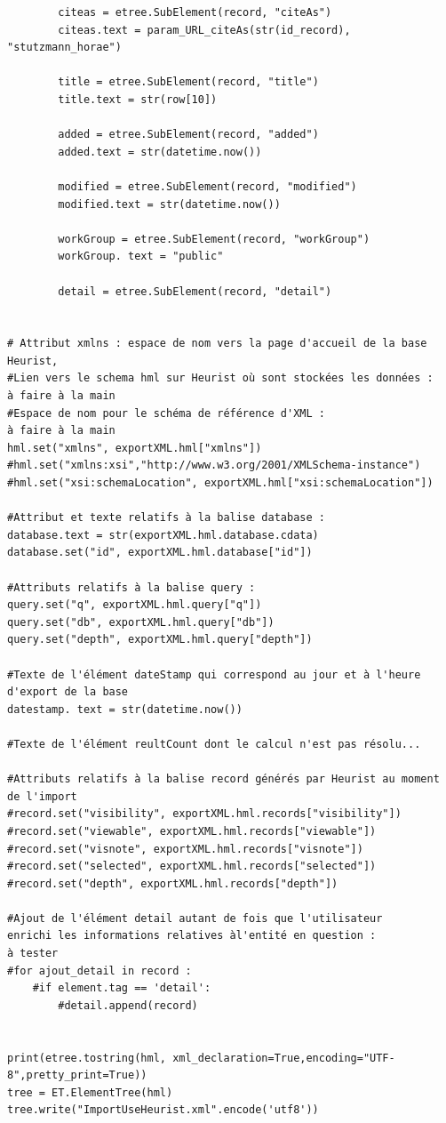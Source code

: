 \documentclass[a4paper,12pt,twoside]{book}
\begin{document}
\begin{verbatim}
        citeas = etree.SubElement(record, "citeAs")       
        citeas.text = param_URL_citeAs(str(id_record), "stutzmann_horae")
        
        title = etree.SubElement(record, "title")
        title.text = str(row[10])

        added = etree.SubElement(record, "added")
        added.text = str(datetime.now())

        modified = etree.SubElement(record, "modified")
        modified.text = str(datetime.now())

        workGroup = etree.SubElement(record, "workGroup")
        workGroup. text = "public"

        detail = etree.SubElement(record, "detail")


# Attribut xmlns : espace de nom vers la page d'accueil de la base Heurist,
#Lien vers le schema hml sur Heurist où sont stockées les données : 
à faire à la main
#Espace de nom pour le schéma de référence d'XML :
à faire à la main
hml.set("xmlns", exportXML.hml["xmlns"])
#hml.set("xmlns:xsi","http://www.w3.org/2001/XMLSchema-instance")
#hml.set("xsi:schemaLocation", exportXML.hml["xsi:schemaLocation"])

#Attribut et texte relatifs à la balise database :
database.text = str(exportXML.hml.database.cdata)
database.set("id", exportXML.hml.database["id"])

#Attributs relatifs à la balise query :
query.set("q", exportXML.hml.query["q"])
query.set("db", exportXML.hml.query["db"])
query.set("depth", exportXML.hml.query["depth"])

#Texte de l'élément dateStamp qui correspond au jour et à l'heure 
d'export de la base
datestamp. text = str(datetime.now())

#Texte de l'élément reultCount dont le calcul n'est pas résolu...

#Attributs relatifs à la balise record générés par Heurist au moment de l'import
#record.set("visibility", exportXML.hml.records["visibility"])
#record.set("viewable", exportXML.hml.records["viewable"])
#record.set("visnote", exportXML.hml.records["visnote"])
#record.set("selected", exportXML.hml.records["selected"])
#record.set("depth", exportXML.hml.records["depth"])

#Ajout de l'élément detail autant de fois que l'utilisateur 
enrichi les informations relatives àl'entité en question :
à tester
#for ajout_detail in record :
	#if element.tag == 'detail':
		#detail.append(record)


print(etree.tostring(hml, xml_declaration=True,encoding="UTF-8",pretty_print=True))
tree = ET.ElementTree(hml)
tree.write("ImportUseHeurist.xml".encode('utf8'))
	\end{verbatim}
	
\end{document}
